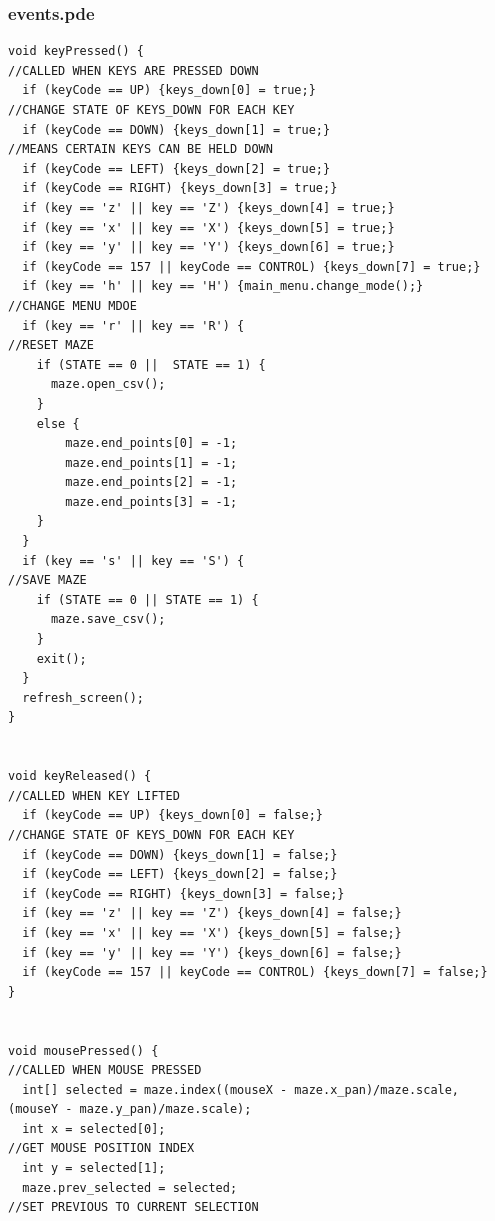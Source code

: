 \documentclass[titlepage]{article}
\begin{document}
\pagebreak
\subsubsection{events.pde}
\begin{changemargin}{-1in}{-1in} 
\begin{verbatim}
void keyPressed() {                                                               //CALLED WHEN KEYS ARE PRESSED DOWN
  if (keyCode == UP) {keys_down[0] = true;}                                       //CHANGE STATE OF KEYS_DOWN FOR EACH KEY
  if (keyCode == DOWN) {keys_down[1] = true;}                                     //MEANS CERTAIN KEYS CAN BE HELD DOWN
  if (keyCode == LEFT) {keys_down[2] = true;}
  if (keyCode == RIGHT) {keys_down[3] = true;}
  if (key == 'z' || key == 'Z') {keys_down[4] = true;}
  if (key == 'x' || key == 'X') {keys_down[5] = true;}
  if (key == 'y' || key == 'Y') {keys_down[6] = true;}
  if (keyCode == 157 || keyCode == CONTROL) {keys_down[7] = true;}
  if (key == 'h' || key == 'H') {main_menu.change_mode();}                        //CHANGE MENU MDOE
  if (key == 'r' || key == 'R') {                                                 //RESET MAZE
    if (STATE == 0 ||  STATE == 1) {
      maze.open_csv();
    }
    else {
        maze.end_points[0] = -1;
        maze.end_points[1] = -1;
        maze.end_points[2] = -1;
        maze.end_points[3] = -1;
    }
  }
  if (key == 's' || key == 'S') {                                                 //SAVE MAZE
    if (STATE == 0 || STATE == 1) {
      maze.save_csv();
    }
    exit();
  }
  refresh_screen();
}


void keyReleased() {                                                              //CALLED WHEN KEY LIFTED
  if (keyCode == UP) {keys_down[0] = false;}                                      //CHANGE STATE OF KEYS_DOWN FOR EACH KEY
  if (keyCode == DOWN) {keys_down[1] = false;}
  if (keyCode == LEFT) {keys_down[2] = false;}
  if (keyCode == RIGHT) {keys_down[3] = false;}
  if (key == 'z' || key == 'Z') {keys_down[4] = false;}
  if (key == 'x' || key == 'X') {keys_down[5] = false;}
  if (key == 'y' || key == 'Y') {keys_down[6] = false;}
  if (keyCode == 157 || keyCode == CONTROL) {keys_down[7] = false;}
}


void mousePressed() {                                                             //CALLED WHEN MOUSE PRESSED
  int[] selected = maze.index((mouseX - maze.x_pan)/maze.scale, (mouseY - maze.y_pan)/maze.scale);
  int x = selected[0];                                                            //GET MOUSE POSITION INDEX
  int y = selected[1];
  maze.prev_selected = selected;                                                  //SET PREVIOUS TO CURRENT SELECTION


\end{verbatim}
\end{changemargin}
\end{document}
